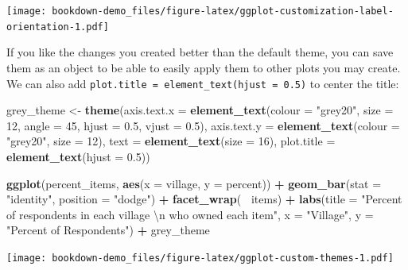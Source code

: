 \documentclass[]{book}
\newenvironment{Shaded}{\begin{snugshade}}{\end{snugshade}}
\newcommand{\KeywordTok}[1]{\textcolor[rgb]{0.13,0.29,0.53}{\textbf{#1}}}
\newcommand{\DataTypeTok}[1]{\textcolor[rgb]{0.13,0.29,0.53}{#1}}
\newcommand{\DecValTok}[1]{\textcolor[rgb]{0.00,0.00,0.81}{#1}}
\newcommand{\FloatTok}[1]{\textcolor[rgb]{0.00,0.00,0.81}{#1}}
\newcommand{\CharTok}[1]{\textcolor[rgb]{0.31,0.60,0.02}{#1}}
\newcommand{\StringTok}[1]{\textcolor[rgb]{0.31,0.60,0.02}{#1}}
\newcommand{\OperatorTok}[1]{\textcolor[rgb]{0.81,0.36,0.00}{\textbf{#1}}}
\newcommand{\NormalTok}[1]{#1}
\begin{document}
\texttt{[image: bookdown-demo\_files/figure-latex/ggplot-customization-label-orientation-1.pdf]}

If you like the changes you created better than the default theme, you
can save them as an object to be able to easily apply them to other
plots you may create. We can also add
\texttt{plot.title\ =\ element\_text(hjust\ =\ 0.5)} to center the
title:

\begin{Shaded}
\begin{Highlighting}[]
\NormalTok{grey_theme <-}\StringTok{ }\KeywordTok{theme}\NormalTok{(}\DataTypeTok{axis.text.x =} \KeywordTok{element_text}\NormalTok{(}\DataTypeTok{colour =} \StringTok{"grey20"}\NormalTok{, }\DataTypeTok{size =} \DecValTok{12}\NormalTok{, }\DataTypeTok{angle =} \DecValTok{45}\NormalTok{, }\DataTypeTok{hjust =} \FloatTok{0.5}\NormalTok{, }\DataTypeTok{vjust =} \FloatTok{0.5}\NormalTok{),}
                    \DataTypeTok{axis.text.y =} \KeywordTok{element_text}\NormalTok{(}\DataTypeTok{colour =} \StringTok{"grey20"}\NormalTok{, }\DataTypeTok{size =} \DecValTok{12}\NormalTok{),}
                    \DataTypeTok{text =} \KeywordTok{element_text}\NormalTok{(}\DataTypeTok{size =} \DecValTok{16}\NormalTok{),}
                    \DataTypeTok{plot.title =} \KeywordTok{element_text}\NormalTok{(}\DataTypeTok{hjust =} \FloatTok{0.5}\NormalTok{))}


\KeywordTok{ggplot}\NormalTok{(percent_items, }\KeywordTok{aes}\NormalTok{(}\DataTypeTok{x =}\NormalTok{ village, }\DataTypeTok{y =}\NormalTok{ percent)) }\OperatorTok{+}
\StringTok{    }\KeywordTok{geom_bar}\NormalTok{(}\DataTypeTok{stat =} \StringTok{"identity"}\NormalTok{, }\DataTypeTok{position =} \StringTok{"dodge"}\NormalTok{) }\OperatorTok{+}
\StringTok{    }\KeywordTok{facet_wrap}\NormalTok{(}\OperatorTok{~}\StringTok{ }\NormalTok{items) }\OperatorTok{+}
\StringTok{    }\KeywordTok{labs}\NormalTok{(}\DataTypeTok{title =} \StringTok{"Percent of respondents in each village }\CharTok{\textbackslash{}n}\StringTok{ who owned each item"}\NormalTok{,}
         \DataTypeTok{x =} \StringTok{"Village"}\NormalTok{,}
         \DataTypeTok{y =} \StringTok{"Percent of Respondents"}\NormalTok{) }\OperatorTok{+}
\StringTok{    }\NormalTok{grey_theme}
\end{Highlighting}
\end{Shaded}

\texttt{[image: bookdown-demo\_files/figure-latex/ggplot-custom-themes-1.pdf]}
\end{document}
